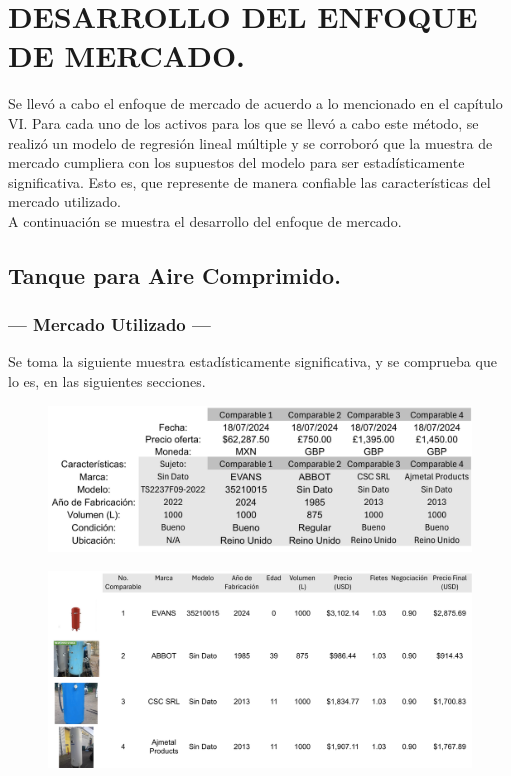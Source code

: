 \chapter{DESARROLLO DEL ENFOQUE DE MERCADO.} %

Se llevó a cabo el enfoque de mercado de acuerdo a lo mencionado en el capítulo VI.
Para cada uno de los activos para los que se llevó a cabo este método, se realizó
un modelo de regresión lineal múltiple y se corroboró que la muestra de mercado
cumpliera con los supuestos del modelo para ser estadísticamente significativa.
Esto es, que represente de manera confiable las características del mercado
utilizado. \\[2mm]
A continuación se muestra el desarrollo del enfoque de mercado.

\section{Tanque para Aire Comprimido.} %

\subsection{\centering --- Mercado Utilizado ---} %
Se toma la siguiente muestra estadísticamente significativa, y se 
comprueba que lo es, en las siguientes secciones.
\begin{figure}[hbtp!]
	\centering
\includegraphics[width= 0.6 \linewidth, page = 1]{../0.imagenes/CAP_8/mercado_1_1}
\end{figure}
\begin{figure}[hbtp!]
	\centering
\includegraphics[width= 0.9 \linewidth, page = 1]{../0.imagenes/CAP_8/mercado_1_2}
\end{figure}

